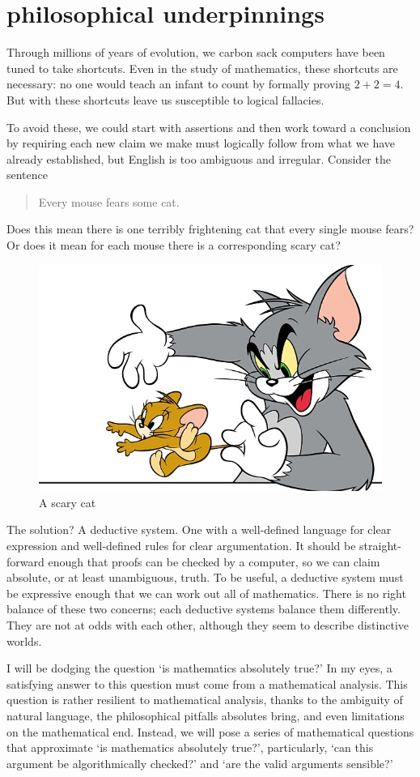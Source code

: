 \message{ !name(truth.tex)}\documentclass{scrbook}
\begin{document}

\tableofcontents{}
\chapter[Philosophical Underpinnings]{philosophical underpinnings}
Through millions of years of evolution, we carbon sack computers have been tuned to take shortcuts. Even in the study of mathematics, these shortcuts are necessary: no one would teach an infant to count by formally proving $2+2=4$. But with these shortcuts leave us susceptible to logical fallacies. 

To avoid these, we could start with assertions and then work toward a conclusion by requiring each new claim we make must logically follow from what we have already established, but English is too ambiguous and irregular. Consider the sentence
\begin{quote}
  Every mouse fears some cat.
\end{quote}
Does this mean there is one terribly frightening cat that every single mouse fears? Or does it mean for each mouse there is a corresponding scary cat? \cite{wiki:cat-gen}
\begin{figure}
  \centering
  \includegraphics[width=.5\textwidth]{images/tom-jerry}
  \caption{A scary cat }
\end{figure}

The solution? A deductive system. One with a well-defined language for clear expression and well-defined rules for clear argumentation. It should be straight-forward enough that proofs can be checked by a computer, so we can claim absolute, or at least unambiguous, truth. To be useful, a deductive system must be expressive enough that we can work out all of mathematics. There is no right balance of these two concerns; each deductive systems balance them differently. They are not at odds with each other, although they seem to describe distinctive worlds. 

I will be dodging the question `is mathematics absolutely true?' In my eyes, a satisfying answer to this question must come from a mathematical analysis. This question is rather resilient to mathematical analysis, thanks to the ambiguity of natural language, the philosophical pitfalls absolutes bring, and even limitations on the mathematical end. Instead, we will pose a series of mathematical questions that approximate `is mathematics absolutely true?', particularly, `can this argument be algorithmically checked?' and `are the valid arguments sensible?'
\end{document}
